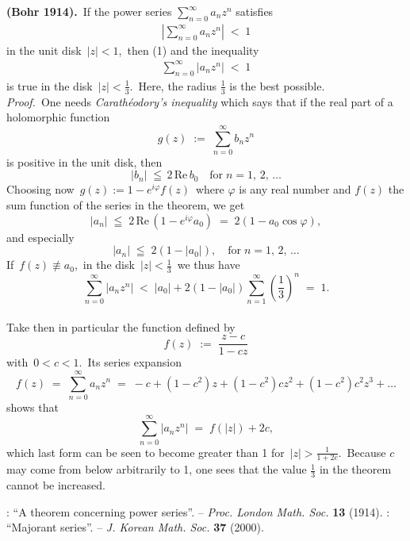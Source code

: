 \documentclass[12pt]{article}
\theoremstyle{definition}
\begin{document}
\textbf{ (Bohr 1914).}\, If the power series 
$\displaystyle\sum_{n=0}^\infty a_nz^n$ satisfies 
\begin{align}
\left|\sum_{n=0}^\infty a_nz^n\right| \;<\; 1
\end{align}
in the unit disk \,$|z| < 1$,\, then (1) and  the inequality
\begin{align}
\sum_{n=0}^\infty|a_nz^n| \;<\; 1
\end{align}
is true in the disk \,$|z| < \frac{1}{3}$.\, Here, the radius $\frac{1}{3}$ is the best possible.\\

\emph{Proof.}\, One needs \emph{Carath\'eodory's inequality} which says that if the real part of a holomorphic function 
$$g(z) \;:=\; \sum_{n=0}^\infty b_nz^n$$
is positive in the unit disk, then 
$$|b_n| \;\leqq\, 2\,\mbox{Re}\,b_0 \quad \mbox{for}\; n = 1,\,2,\,\ldots$$
Choosing now\, $g(z) := 1\!-\!e^{i\varphi}f(z)$\, where $\varphi$ is any real number and $f(z)$ the sum function of the series in the theorem, we get
$$|a_n| \;\leqq\; 2\,\mbox{Re}\,(1\!-\!e^{i\varphi}a_0) \;=\; 2(1\!-\!a_0\cos\varphi),$$
and especially
$$|a_n| \;\leqq\; 2(1\!-\!|a_0|), \quad \mbox{for}\; n = 1,\,2,\,\ldots$$
If\, $f(z) \not\equiv a_0$,\, in the disk\, $|z| < \frac{1}{3}$\, we thus have
$$\sum_{n=0}^\infty|a_nz^n| \;<\; |a_0|+2(1\!-\!|a_0|)\sum_{n=1}^\infty\left(\frac{1}{3}\right)^n \;=\;1.$$\\
Take then in particular the function defined by
$$f(z) \;:=\; \frac{z\!-\!c}{1\!-\!cz}$$
with\, $0 < c < 1$.\, Its series expansion
$$f(z) \;=\; \sum_{n=0}^\infty a_nz^n \;=\; -c+(1\!-\!c^2)z+(1\!-\!c^2)cz^2+(1\!-\!c^2)c^2z^3+\ldots$$
shows that
$$\sum_{n=0}^\infty|a_nz^n| \;=\; f(|z|)+2c,$$
which last form can be seen to become greater than 1 for\, $\displaystyle|z| > \frac{1}{1\!+\!2c}$.\, Because $c$ may come from below arbitrarily  to 1, one sees that the value $\frac{1}{3}$ in the theorem cannot be increased.



\begin{thebibliography}{9}
: ``A theorem concerning power series''. -- \emph{Proc. London Math. Soc.} \textbf{13} (1914).
: ``Majorant series''. -- \emph{J. Korean Math. Soc.} \textbf{37} (2000).
\end{thebibliography}


\end{document}
